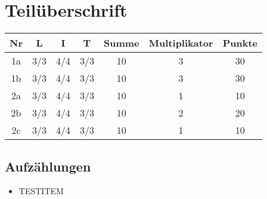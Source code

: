 \section{Teilüberschrift}


\begin{table}[!htp]
  \centering
  \begin{tabular}{|c|c|c|c|c|c|c|}
  \hline
  \textbf{Nr} & \textbf{L} & \textbf{I} & \textbf{T} & \textbf{Summe} & \textbf{Multiplikator} & \textbf{Punkte} \\ \hline
  1a          & 3/3        & 4/4        & 3/3        & 10             & 3                      & 30              \\ \hline
  1b          & 3/3        & 4/4        & 3/3        & 10             & 3                      & 30              \\ \hline
  2a          & 3/3        & 4/4        & 3/3        & 10             & 1                      & 10              \\ \hline
  2b          & 3/3        & 4/4        & 3/3        & 10             & 2                      & 20              \\ \hline
  2c          & 3/3        & 4/4        & 3/3        & 10             & 1                      & 10              \\ \hline
  \end{tabular}
\end{table}

\subsection{Aufzählungen}
\begin{itemize}
  \item TESTITEM
\end{itemize}

%
%
%







